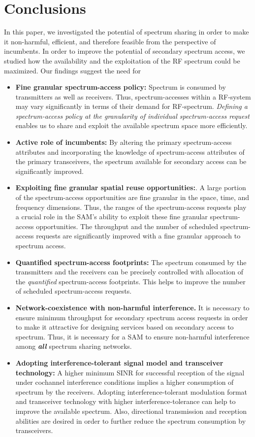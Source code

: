 \documentclass[12pt, draftclsnofoot, onecolumn]{IEEEtran}
\begin{document}
\section{Conclusions}
In this paper, we investigated the potential of spectrum sharing in order to make it non-harmful, efficient, and therefore feasible from the perspective of incumbents. In order to improve the potential of secondary spectrum access, we studied how the availability and the exploitation of the RF spectrum could be maximized. Our findings suggest the need for 
\begin{itemize}
  \item \textbf{Fine granular spectrum-access policy:} Spectrum is consumed by transmitters as well as receivers. Thus, spectrum-accesses within a RF-system may vary significantly in terms of their demand for RF-spectrum. \textit{Defining a spectrum-access policy at the granularity of individual spectrum-access request} enables us to share and exploit the available spectrum space more efficiently.
  \item \textbf{Active role of incumbents:} By altering the primary spectrum-access attributes and incorporating the knowledge of spectrum-access attributes of the primary transceivers, the spectrum available for secondary access can be significantly improved.
  \item \textbf{Exploiting fine granular spatial reuse opportunities:}. A large portion of the spectrum-access opportunities are fine granular in the space, time, and frequency dimensions. Thus, the ranges of the spectrum-access requests play a crucial role in the SAM's ability to exploit these fine granular spectrum-access opportunities. The throughput and the number of scheduled spectrum-access requests are significantly improved with a fine granular approach to spectrum access.  
	\item \textbf{Quantified spectrum-access footprints:}  The spectrum consumed by the transmitters and the receivers can be precisely controlled with allocation of the \textit{quantified} spectrum-access footprints. This helps to improve the number of scheduled spectrum-access requests.
  \item \textbf{Network-coexistence with non-harmful interference.}  It is necessary to ensure minimum throughput for secondary spectrum access requests in order to make it attractive for designing services based on secondary access to spectrum. Thus, it is necessary for a SAM to ensure non-harmful interference among \textbf{\textit{all}} spectrum sharing networks.
	 \item \textbf{Adopting interference-tolerant signal model and transceiver technology:} A higher minimum SINR for successful reception of the signal under cochannel interference conditions implies a higher consumption of spectrum by the receivers.  Adopting interference-tolerant modulation format and transceiver technology with higher interference-tolerance can help to improve the available spectrum. Also, directional transmission and reception abilities are desired in order to further reduce the spectrum consumption by transceivers.
\end{itemize}
\end{document}

